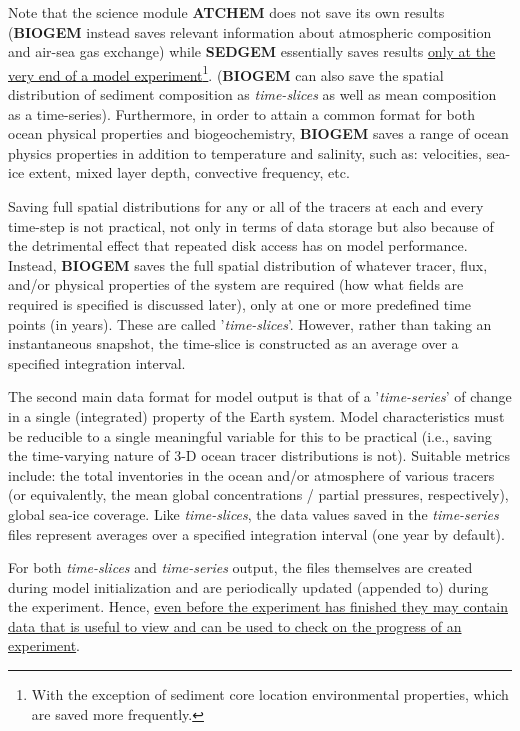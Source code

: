 \documentclass[11pt,fleqn]{book} %
\begin{document}
Note that the science module \textbf{ATCHEM} does not save its own results (\textbf{BIOGEM} instead saves relevant information about atmospheric composition and air-sea gas exchange) while \textbf{SEDGEM} essentially saves results \uline{only at the very end of a model experiment}\footnote{With the exception of sediment core location environmental properties, which are saved more frequently.}. (\textbf{BIOGEM} can also save the spatial distribution of sediment composition as \textit{time-slices} as well as mean composition as a time-series). Furthermore, in order to attain a common format for both ocean physical properties and biogeochemistry, \textbf{BIOGEM} saves a range of ocean physics properties in addition to temperature and salinity, such as: velocities, sea-ice extent, mixed layer depth, convective frequency, etc.

Saving full spatial distributions for any or all of the tracers at each and every time-step is not practical, not only in terms of data storage but also because of the detrimental effect that repeated disk access has on model performance. Instead, \textbf{BIOGEM} saves the full spatial distribution of whatever tracer, flux, and/or physical properties of the system are required (how what fields are required is specified is discussed later), only at one or more predefined time points (in years). These are called '\textit{time-slices}'. However, rather than taking an instantaneous snapshot, the time-slice is constructed as an average over a specified integration interval.

The second main data format for model output is that of a '\textit{time-series}' of change in a single (integrated) property of the Earth system. Model characteristics must be reducible to a single meaningful variable for this to be practical (i.e., saving the time-varying nature of 3-D ocean tracer distributions is not). Suitable metrics include: the total inventories in the ocean and/or atmosphere of various tracers (or equivalently, the mean global concentrations / partial pressures, respectively), global sea-ice coverage. Like \textit{time-slices}, the data values saved in the \textit{time-series} files represent averages over a specified integration interval (one year by default).

For both \textit{time-slices} and \textit{time-series} output, the files themselves are created during model initialization and are periodically updated (appended to) during the experiment. Hence, \uline{even before the experiment has finished they may contain data that is useful to view and can be used to check on the progress of an experiment}.
\end{document}
